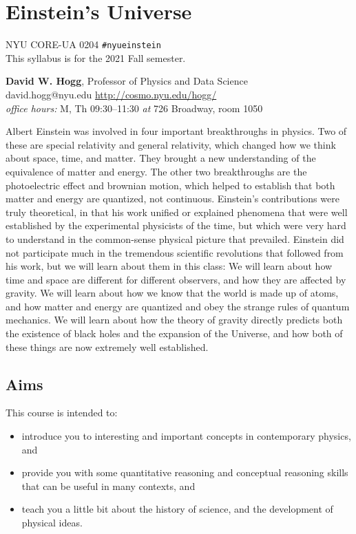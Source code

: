 \documentclass[12pt, letterpaper]{article}
\begin{document}
\sloppy\sloppypar\raggedbottom\frenchspacing

\section*{Einstein's Universe}
NYU CORE-UA 0204 \hfill \texttt{\#nyueinstein}\\
This syllabus is for the 2021 Fall semester.

\bigskip
\noindent
\textbf{David W. Hogg}, Professor of Physics and Data Science \\
david.hogg@nyu.edu \hfill \url{http://cosmo.nyu.edu/hogg/} \\
\textsl{office hours:} M, Th 09:30--11:30 \textsl{at} 726 Broadway, room 1050

\bigskip
\noindent
Albert Einstein was involved in four important breakthroughs in
physics.
Two of these are special relativity and general relativity, which
changed how we think about space, time, and matter.
They brought a new
understanding of the equivalence of matter and energy.
The other two breakthroughs are the photoelectric effect and brownian
motion, which helped to establish that both matter and energy are quantized,
not continuous.
Einstein's contributions were truly theoretical, in that his work
unified or explained phenomena that were well established by the
experimental physicists of the time, but which were very hard to
understand in the common-sense physical picture that prevailed.
Einstein did not participate much in the tremendous scientific
revolutions that followed from his work, but we will learn about
them in this class:
We will learn about how time and space are different for different
observers, and how they are affected by gravity.
We will learn about how we know that the world is made up of atoms,
and how matter and energy are quantized and obey the strange rules of
quantum mechanics.
We will learn about how the theory of gravity directly predicts both
the existence of black holes and the expansion of the Universe, and
how both of these things are now extremely well established.

\subsection*{Aims}

This course is intended to:
\begin{itemize}
\item
introduce you to interesting and important concepts in contemporary
physics, and
\item
provide you with some quantitative reasoning and conceptual
reasoning skills that can be useful in many contexts, and
\item
teach you a little bit about the history of science,
and the development of physical ideas.
\end{itemize}
\end{document}
